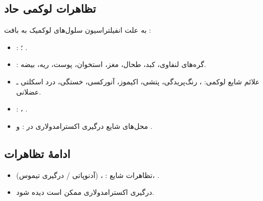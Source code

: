 \documentclass[12pt,a4paper]{article}
\begin{document}
\subsection*{تظاهرات لوکمی حاد}
به علت انفیلتراسیون سلول‌های لوکمیک به بافت :
\begin{itemize}
\item {}: ؛ .
\item {}: گره‌های لنفاوی، کبد، طحال، مغز، استخوان، پوست، ریه، بیضه.
\item علائم شایع لوکمی: ، رنگ‌پریدگی، پتشی، اکیموز، آنورکسی، خستگی، درد اسکلتی ـ عضلانی.
\item {}: ، .
\item محل‌های شایع درگیری اکسترامدولاری در :  و .
\end{itemize}

\subsection*{ادامهٔ تظاهرات}
\begin{itemize}
\item تظاهرات شایع : ،  (آدنوپاتی / درگیری تیموس)، .
\item درگیری اکسترامدولاری  ممکن است  دیده شود.
\end{itemize}
\end{document}

